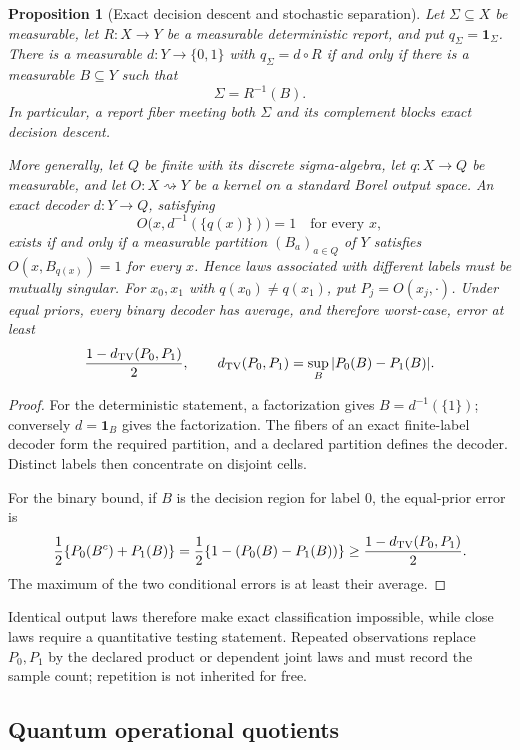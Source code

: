 \documentclass[11pt,a4paper]{article}
\theoremstyle{definition}
\theoremstyle{plain}
\newtheorem{proposition}[definition]{Proposition}
\theoremstyle{remark}
\begin{document}
\begin{proposition}[Exact decision descent and stochastic separation]
\label{prop:decisiondescent}
Let \(\Sigma\subseteq X\) be measurable, let
\(R:X\to Y\) be a measurable deterministic report, and put
\(q_\Sigma=\mathbf 1_\Sigma\).  There is a measurable
\(d:Y\to\{0,1\}\) with \(q_\Sigma=d\circ R\) if and only if there is a
measurable \(B\subseteq Y\) such that
\[
 \Sigma=R^{-1}(B).
\]
In particular, a report fiber meeting both \(\Sigma\) and its complement
blocks exact decision descent.

More generally, let \(Q\) be finite with its discrete sigma-algebra, let
\(q:X\to Q\) be measurable, and let
\(O:X\rightsquigarrow Y\) be a kernel on a standard Borel output space.  An
exact decoder \(d:Y\to Q\), satisfying
\[
 O\bigl(x,d^{-1}(\{q(x)\})\bigr)=1
 \quad\text{for every }x,
\]
exists if and only if a measurable partition \((B_a)_{a\in Q}\) of \(Y\)
satisfies \(O(x,B_{q(x)})=1\) for every \(x\).  Hence laws associated with
different labels must be mutually singular.  For
\(x_0,x_1\) with \(q(x_0)\ne q(x_1)\), put
\(P_j=O(x_j,\cdot)\).  Under equal priors, every binary decoder has average,
and therefore worst-case, error at least
\[
 \frac{1-d_{\rm TV}(P_0,P_1)}2,\qquad
 d_{\rm TV}(P_0,P_1)=\sup_B|P_0(B)-P_1(B)|.
\]
\end{proposition}
\begin{proof}
For the deterministic statement, a factorization gives
\(B=d^{-1}(\{1\})\); conversely \(d=\mathbf 1_B\) gives the
factorization.  The fibers of an exact finite-label decoder form the required
partition, and a declared partition defines the decoder.  Distinct labels
then concentrate on disjoint cells.

For the binary bound, if \(B\) is the decision region for label \(0\), the
equal-prior error is
\[
 \frac12\{P_0(B^c)+P_1(B)\}
 =\frac12\{1-(P_0(B)-P_1(B))\}
 \geq\frac{1-d_{\rm TV}(P_0,P_1)}2.
\]
The maximum of the two conditional errors is at least their average.
\end{proof}

Identical output laws therefore make exact classification impossible, while
close laws require a quantitative testing statement.  Repeated observations
replace \(P_0,P_1\) by the declared product or dependent joint laws and must
record the sample count; repetition is not inherited for free.

\subsection{Quantum operational quotients}
\end{document}
